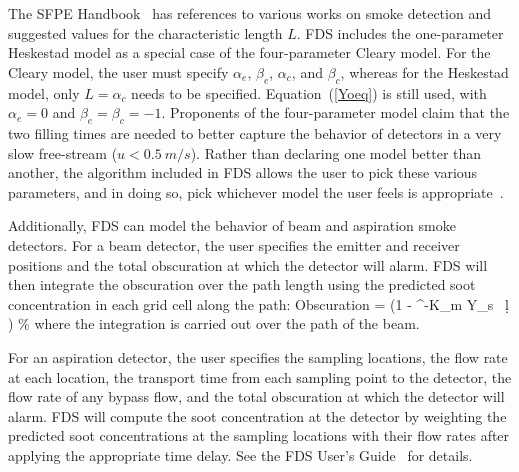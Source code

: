 The SFPE Handbook~\cite{SFPE} has references to various works on smoke detection and suggested values for the
characteristic length $L$. FDS includes the one-parameter Heskestad model as a special case of the four-parameter
Cleary model. For the Cleary model, the user must specify
$\alpha_e$, $\beta_e$, $\alpha_c$, and $\beta_c$, whereas for the Heskestad model, only $L=\alpha_c$ needs to be
specified. Equation~(\ref{Yoeq})
is still used, with $\alpha_e=0$ and $\beta_e=\beta_c=-1$.
Proponents of the four-parameter model claim that the two filling times are needed to
better capture the behavior of detectors in a very
slow free-stream ($u<\SI{0.5}{m/s}$). Rather than declaring one model better than another,
the algorithm included in FDS allows the
user to pick these various parameters, and in doing so, pick whichever model the user feels is appropriate~\cite{CSE_GCR}.

Additionally, FDS can model the behavior of beam and aspiration smoke detectors.  For a beam detector, the user
specifies the emitter and receiver positions and the total obscuration at which the detector will alarm.  FDS will then
integrate the obscuration over the path length using the predicted soot concentration in each grid cell along
the path:
\be
  \hbox{Obscuration}  = \left(1 - ^{-K_m \int \rho Y_s \, \d l }  \right)   \; \; \hbox{\%}
\ee
where the integration is carried out over the path of the beam.

For an aspiration detector, the user specifies the sampling locations, the flow rate at each location, the
transport time from each sampling point to the detector, the flow rate of any bypass flow, and the total obscuration at which the
detector will alarm.  FDS will compute the soot concentration at the detector by weighting the predicted soot concentrations
at the sampling locations with their flow rates after applying the appropriate time delay. See the FDS User's Guide~\cite{FDS_Users_Guide} for details.

